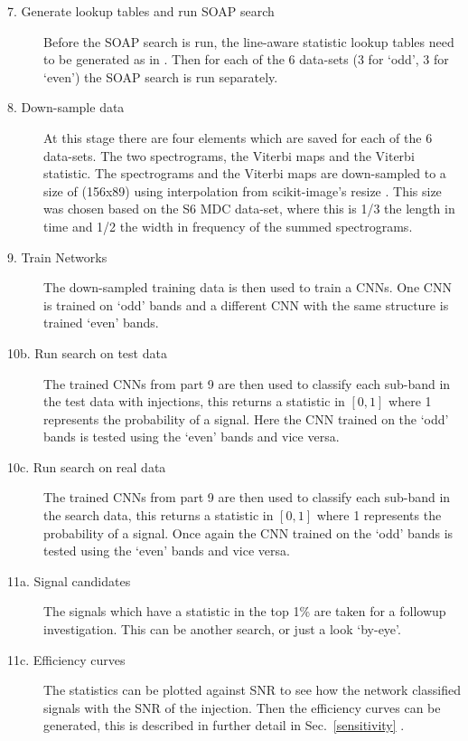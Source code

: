 \begin{description}
	\item[7. Generate lookup tables and run SOAP search] Before the SOAP search is run, the line-aware statistic lookup tables need to be generated as in \cite{bayley2019SOAPGeneralised}. Then for each of the 6 data-sets (3 for `odd', 3 for `even') the SOAP search is run separately. 
	
	\item[8. Down-sample data] At this stage there are four elements which are saved for each of the 6 data-sets. The two spectrograms, the Viterbi maps and the Viterbi statistic. The spectrograms and the Viterbi maps are down-sampled to a size of (156x89) using interpolation from scikit-image's resize \cite{vanderwalt2014ScikitimageImage}. This size was chosen based on the S6 \ac{MDC} data-set, where this is 1/3 the length in time and 1/2 the width in frequency of the summed spectrograms.
	
	\item[9. Train Networks] The down-sampled training data is then used to train a \acp{CNN}. One \ac{CNN} is trained on `odd' bands and a different \ac{CNN} with the same structure is trained `even' bands. 
	
	\item[10b. Run search on test data] The trained \acp{CNN} from part 9 are then used to classify each sub-band in the test data with injections, this returns a statistic in $[0,1]$ where 1 represents the probability of a signal. Here the \ac{CNN} trained on the `odd' bands is tested using the `even' bands and vice versa.
	
	\item[10c. Run search on real data] The trained \acp{CNN} from part 9 are then used to classify each sub-band in the search data, this returns a statistic in $[0,1]$ where 1 represents the probability of a signal. Once again the \ac{CNN} trained on the `odd' bands is tested using the `even' bands and vice versa.
	
	\item[11a. Signal candidates] The signals which have a statistic in the top 1\% are taken for a followup investigation. This can be another search, or just a look `by-eye'.
	
	\item[11c. Efficiency curves] The statistics can be plotted against \ac{SNR} to see how the network classified signals with the \ac{SNR} of the injection. Then the efficiency curves can be generated, this is described in further detail in Sec.~\ref{sensitivity} .
	
	
	
\end{description}


